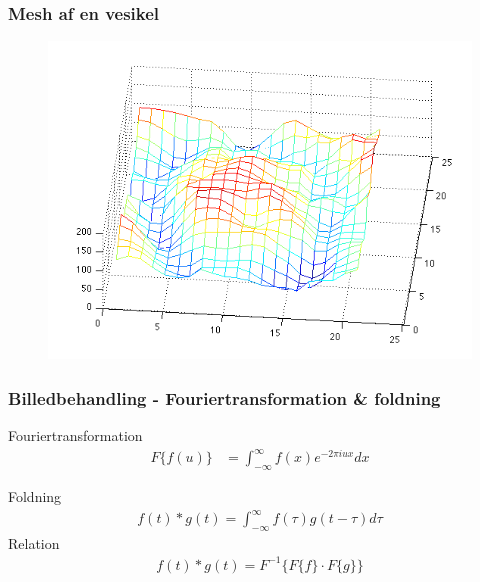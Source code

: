 \documentclass[12pt,t]{beamer}
\begin{document}
\begin{frame}
\frametitle{Mesh af en vesikel}
\begin{figure}[H]
	\centering
	\includegraphics[scale=0.4]{img/ves/mesh.png}
\end{figure}
\end{frame}

\begin{frame}
\frametitle{Billedbehandling - Fouriertransformation \& foldning}
Fouriertransformation
\begin{align*}
	F\{f(u)\} &= \int_{-\infty}^{\infty} f(x) e^{-2 \pi i u x} dx
\end{align*}

Foldning
\begin{align*}
	f(t)*g(t)=\int_{-\infty}^{\infty}f(\tau)g(t-\tau)d\tau
\end{align*}
Relation
\begin{align*}
	f(t)*g(t)= F^{-1} \{F\{f\} \cdot  F\{g\} \}
\end{align*} 

\end{frame}
\end{document}
